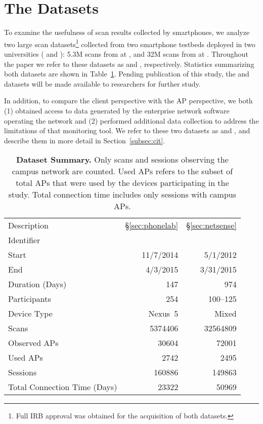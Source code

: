 
\section{The Datasets}
\label{sec:dataset}

To examine the usefulness of \wifi{} scan results collected by smartphones, we
analyze two large scan datasets\footnote{Full IRB approval was obtained for the
acquisition of both datasets.} collected from two smartphone testbeds deployed
in two universities (\ub{} and \nd{}): 5.3M scans from
\PhoneLab{} at \ub{}, and 32M scans from \NetSense{} at \nd{}.
Throughout the paper we refer to these datasets as \textbf{\ubscan{}} and
\textbf{\ndscan{}}, respectively. Statistics summarizing both datasets are
shown in Table~\ref{tab:stats}. Pending publication of this study, the \ubscan{}
and \ndscan{} datasets will be made available to researchers for further study.

In addition, to compare the client perspective with the AP perspective, we
both (1) obtained access to data generated by the enterprise network software
operating the \ub{} \wifi{} network and (2) performed additional data collection
to address the limitations of that monitoring tool. We refer to these two
datasets as \textbf{\ubap{}} and \textbf{\ubapdetail{}}, and describe them in
more detail in Section~\ref{subsec:cit}.

\begin{table}[t]
  {\small
  \begin{tabularx}{\columnwidth}{Xrr}
    & \PhoneLab{} & \NetSense{}\\\midrule
    Description & \S\ref{sec:phonelab} & \S\ref{sec:netsense} \\
    Identifier & \ubscan{} & \ndscan{} \\ 
    Start & 11/7/2014 & 5/1/2012 \\ 
    End & 4/3/2015 & 3/31/2015 \\ 
    Duration (Days) & 147 & 974 \\ \midrule
    Participants & 254 & 100--125 \\
    Device Type & Nexus~5 & Mixed \\ \midrule
    Scans & \num{5374406} & \num{32564809} \\
    Observed APs & \num{30604} & \num{72001} \\
    Used APs & \num{2742} & \num{2495}\\ \midrule
    \wifi{} Sessions & \num{160886} & \num{149863} \\
    Total Connection Time (Days) & \num{23322} & \num{50969} 
  \end{tabularx}
  \caption{\textbf{Dataset Summary.} Only \wifi{} scans and sessions
  observing the campus network are counted. Used APs refers to the subset of
  total APs that were used by the devices participating in the study. Total
connection time includes only \wifi{} sessions with campus APs.}
  \label{tab:stats}
  \vspace*{-5mm}
}
\end{table}


